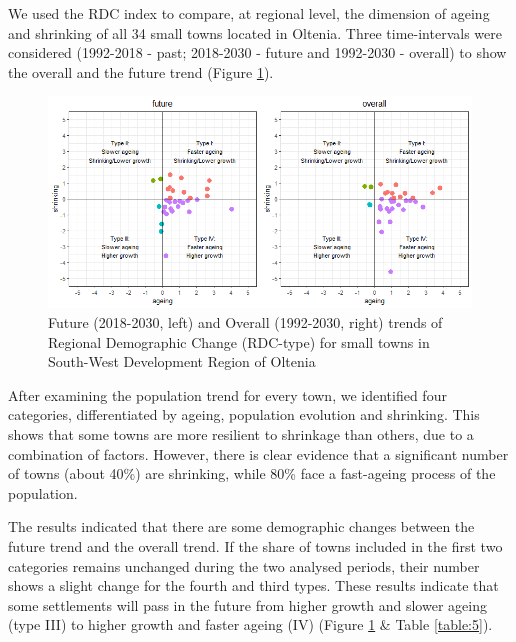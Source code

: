 We used the RDC index to compare, at regional level, the dimension of ageing and shrinking of all 34 small towns located in Oltenia. Three time-intervals were considered (1992-2018 - past; 2018-2030 - future and 1992-2030 - overall) to show the overall and the future trend (Figure \ref{figure:rdc}).

\begin{figure}[htbp]
	\centering
	\includegraphics[width=1\textwidth]{rdc}
	\caption{Future (2018-2030, left) and Overall (1992-2030, right) trends of Regional Demographic Change (RDC-type) for small towns in South-West Development Region of Oltenia}
	\label{figure:rdc}
\end{figure}

After examining the population trend for every town, we identified four categories, differentiated by ageing, population evolution and shrinking. This shows that some towns are more resilient to shrinkage than others, due to a combination of factors. However, there is clear evidence that a significant number of towns (about 40\%) are shrinking, while 80\% face a fast-ageing process of the population.

The results indicated that there are some demographic changes between the future trend and the overall trend. If the share of towns included in the first two categories remains unchanged during the two analysed periods, their number shows a slight change for the fourth and third types. These results indicate that some settlements will pass in the future from higher growth and slower ageing (type III) to higher growth and faster ageing (IV) (Figure \ref{figure:rdc} \& Table \ref{table:5}).


